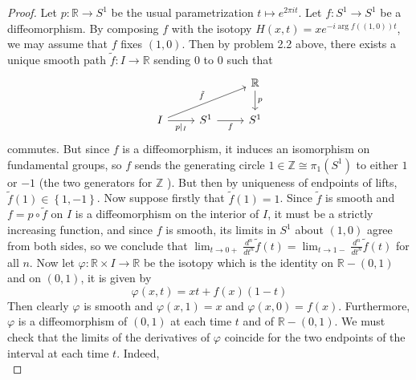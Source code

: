 \documentclass[reqno]{amsart}
\theoremstyle{definition}
\theoremstyle{remark}
\begin{document}
\begin{proof}
        Let $p \colon \mathbb{R}
        \to S^{1}$ be the usual parametrization
        $t \mapsto e^{2 \pi i t}$. Let
        $f \colon S^{1} \to S^{1}$ be a diffeomorphism.
        By composing $f$ with the isotopy
        $H(x,t) = x e^{- i \arg f((1,0)) t}$, we
        may assume that $f$ fixes $(1,0)$.
        Then by problem 2.2 above, there
        exists a unique smooth path
        $\tilde{f} \colon I \to \mathbb{R}$
        sending $0$ to $0$ such that
        \begin{equation*}
        \begin{tikzcd}
            & & \mathbb{R} \ar[d, "p"]\\
            I \ar[r, "p|_{I}"'] 
            \ar[rru, "\tilde{f}"] & S^{1} \ar[r, "f"'] & S^{1}
        \end{tikzcd}
        \end{equation*}
        commutes.
        But
        since $f$ is a diffeomorphism, it 
        induces an isomorphism on
        fundamental groups,
        so $f$ sends the generating circle
        $1 \in \mathbb{Z} \cong \pi_1(S^{1})$ to
        either $1$ or $-1$ (the two generators for
        $\mathbb{Z}$ ).
        But then by uniqueness of endpoints of lifts,
        $\tilde{f}(1) \in \left\{ 1,-1 \right\} $.
        Now suppose firstly that
        $\tilde{f}(1) = 1$.
        Since $\tilde{f}$ is smooth and
        $f = p \circ \tilde{f}$ on $I$ is a diffeomorphism
        on the interior of $I$, it must be
        a strictly increasing function, and
        since $f$ is smooth, 
        its limits in  $S^{1}$ about $(1,0)$ agree
        from both sides, so we conclude that
        $\lim_{t \to 0+} \frac{d^{n}}{dt^{n}} \tilde{f}(t)
        = \lim_{t \to 1-} \frac{d^{n}}{dt^n}
        \tilde{f}(t)$ for all $n$.
        Now let
        $\varphi \colon
        \mathbb{R} \times I \to \mathbb{R}$ 
        be the isotopy
        which is the identity on
        $\mathbb{R} - (0,1)$ and
        on $\left( 0,1 \right) $, it is given by
        \[
        \varphi (x,t) =
        x t + f(x) (1-t)
        \] 
        Then
        clearly
        $\varphi $ is smooth and
        $\varphi (x,1) = x$ and
        $\varphi (x,0) = f(x)$.
        Furthermore,
        $\varphi $
        is a diffeomorphism of  $\left( 0,1 \right) $ 
        at each time $t$ and of 
        $\mathbb{R} - \left( 0,1 \right) $.
        We must check that the limits of
         the derivatives of $\varphi $ coincide for
         the two endpoints of the interval at each
         time $t$.
         Indeed,
         \[
\]
\end{proof}
\end{document}
